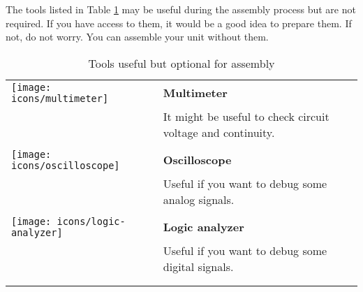 The tools listed in Table \ref{table:assembly-opt-tools} may be useful during the assembly process but are not required. If you have access to them, it would be a good idea to prepare them. If not, do not worry. You can assemble your unit without them.

\begin{longtable}{m{10mm}|m{100mm}}
	\centering
	\texttt{[image: icons/multimeter]}     & {\bf Multimeter}                                            \\
	                                       & It might be useful to check circuit voltage and continuity. \\
	                                       &                                                             \\
	\texttt{[image: icons/oscilloscope]}   & {\bf Oscilloscope}                                          \\
	                                       & Useful if you want to debug some analog signals.            \\
	                                       &                                                             \\
	\texttt{[image: icons/logic-analyzer]} & {\bf Logic analyzer}                                        \\
	                                       & Useful if you want to debug some digital signals.           \\
	                                       &                                                             \\
	\caption{Tools useful but optional for assembly}
	\label{table:assembly-opt-tools}
\end{longtable}


